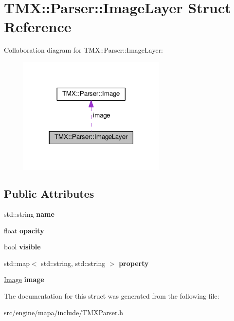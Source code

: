 \hypertarget{struct_t_m_x_1_1_parser_1_1_image_layer}{}\section{T\+MX\+:\+:Parser\+:\+:Image\+Layer Struct Reference}
\label{struct_t_m_x_1_1_parser_1_1_image_layer}


Collaboration diagram for T\+MX\+:\+:Parser\+:\+:Image\+Layer\+:\nopagebreak
\begin{figure}[H]
\begin{center}
\leavevmode
\includegraphics[width=209pt]{struct_t_m_x_1_1_parser_1_1_image_layer__coll__graph}
\end{center}
\end{figure}
\subsection*{Public Attributes}
\begin{DoxyCompactItemize}
\item 
std\+::string {\bfseries name}\hypertarget{struct_t_m_x_1_1_parser_1_1_image_layer_a55c71607f797100313d1da6c6ca21da7}{}\label{struct_t_m_x_1_1_parser_1_1_image_layer_a55c71607f797100313d1da6c6ca21da7}

\item 
float {\bfseries opacity}\hypertarget{struct_t_m_x_1_1_parser_1_1_image_layer_ad368ed956362b077318028f4e443a465}{}\label{struct_t_m_x_1_1_parser_1_1_image_layer_ad368ed956362b077318028f4e443a465}

\item 
bool {\bfseries visible}\hypertarget{struct_t_m_x_1_1_parser_1_1_image_layer_a26c77c9faa5ad39b67eabb43d9b11335}{}\label{struct_t_m_x_1_1_parser_1_1_image_layer_a26c77c9faa5ad39b67eabb43d9b11335}

\item 
std\+::map$<$ std\+::string, std\+::string $>$ {\bfseries property}\hypertarget{struct_t_m_x_1_1_parser_1_1_image_layer_a9e2ed5e998a91e60addc4b750478bd37}{}\label{struct_t_m_x_1_1_parser_1_1_image_layer_a9e2ed5e998a91e60addc4b750478bd37}

\item 
\hyperlink{struct_t_m_x_1_1_parser_1_1_image}{Image} {\bfseries image}\hypertarget{struct_t_m_x_1_1_parser_1_1_image_layer_af6ce802033d9e4bf9a6875ad29193dad}{}\label{struct_t_m_x_1_1_parser_1_1_image_layer_af6ce802033d9e4bf9a6875ad29193dad}

\end{DoxyCompactItemize}


The documentation for this struct was generated from the following file\+:\begin{DoxyCompactItemize}
\item 
src/engine/mapa/include/T\+M\+X\+Parser.\+h\end{DoxyCompactItemize}
